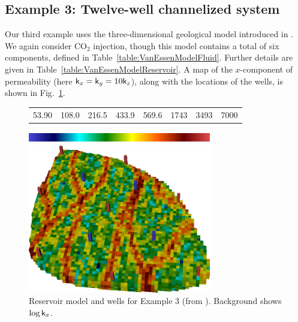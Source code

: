 \documentclass[twocolumn,numbook]{svjour3}          %
\begin{document}
\subsection{Example 3: Twelve-well channelized system}


Our third example uses the three-dimensional geological model introduced in
\cite{VanEssen}. We again consider CO$_2$ injection, though this model
contains a total of six components, defined in
Table~\ref{table:VanEssenModelFluid}. Further details are given in Table~\ref{table:VanEssenModelReservoir}.  A map of
the $x$-component of permeability (here $\mathsf{k}_x = \mathsf{k}_y = 10\mathsf{k}_z$), along with the
locations of the wells, is shown in Fig.~\ref{fig:VanEssenModelPermeabilityAndWells}.


\begin{figure}[ht]
     \begin{center}
      \begin{tabular}{cccccccc}
      53.90 & 108.0 & 216.5 & 433.9 & 569.6 & 1743 & 3493 & 7000 
      \end{tabular}
       \includegraphics[width=8cm,height=0.5cm]{VanEssenModelPermeabilityMapColorBar.png}
                                                            
       \medskip
       
       \includegraphics[width=8cm]{VanEssenModelPermeabilityMapConstant.png}%
     \end{center}
     \caption{Reservoir model and wells for Example 3 (from \cite{VanEssen}). Background shows $\log \mathsf{k}_x$.}
  \label{fig:VanEssenModelPermeabilityAndWells}
\end{figure}
\end{document}
